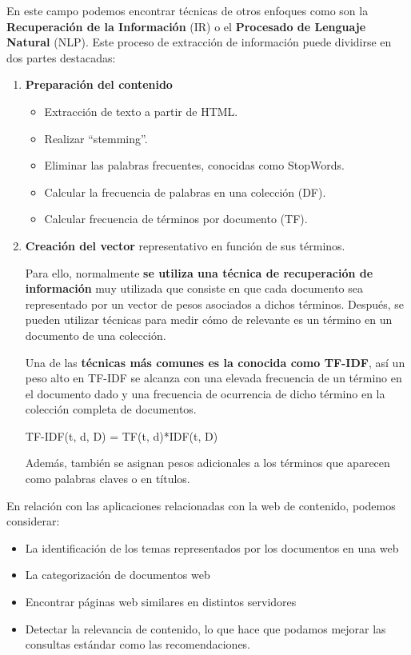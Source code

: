 \documentclass[12pt, twoside, openright]{report} %
\begin{document}
En este campo podemos encontrar técnicas de otros enfoques como son la \textbf{Recuperación de la Información} (IR) o el \textbf{Procesado de Lenguaje Natural} (NLP). Este proceso de extracción de información puede dividirse en dos partes destacadas:
\begin{enumerate}
	\item \textbf{Preparación del contenido}
	\begin{itemize}
		\item Extracción de texto a partir de HTML.
		\item Realizar “stemming”.
		\item Eliminar las palabras frecuentes, conocidas como StopWords.
		\item Calcular la frecuencia de palabras en una colección (DF).
		\item Calcular frecuencia de términos por documento (TF).
	\end{itemize}
	\item \textbf{Creación del vector} representativo en función de sus términos. 
	
	Para ello, normalmente \textbf{se utiliza una técnica de recuperación de información} muy utilizada que consiste en que cada documento sea representado por un vector de pesos asociados a dichos términos. Después, se pueden utilizar técnicas para medir cómo de relevante es un término en un documento de una colección. 
	
	Una de las \textbf{técnicas más comunes es la conocida como TF-IDF}, así un peso alto en TF-IDF se alcanza con una elevada frecuencia de un término en el documento dado y una frecuencia de ocurrencia de dicho término en la colección completa de documentos. 

	TF-IDF(t, d, D) = TF(t, d)*IDF(t, D)
	
	Además, también se asignan pesos adicionales a los términos que aparecen como palabras claves o en títulos.
\end{enumerate}

En relación con las aplicaciones relacionadas con la web de contenido, podemos considerar:
\begin{itemize}
	\item La identificación de los temas representados por los documentos en una web
	\item La categorización de documentos web
	\item Encontrar páginas web similares en distintos servidores
	\item Detectar la relevancia de contenido, lo que hace que podamos mejorar las consultas estándar como las recomendaciones.
\end{itemize}
\end{document}
